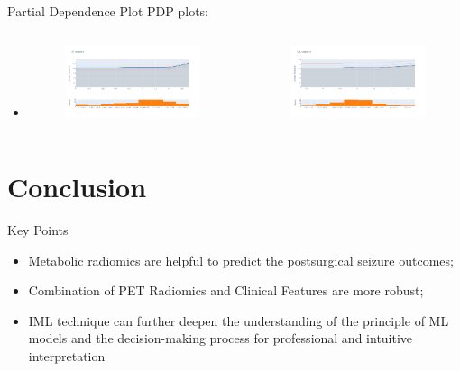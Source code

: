\documentclass[
  10pt,
  ignorenonframetext,
  fontset=fandol]{beamer}
\begin{document}
\begin{frame}{Partial Dependence Plot}
\protect\hypertarget{partial-dependence-plot}{}
PDP plots:

\begin{itemize}[<+->]
\item \begin{columns}
\begin{figure}
\centering
\includegraphics[width=6cm]{images/pdp_1.png}
\end{figure}
\begin{figure}
\centering
\includegraphics[width=6cm]{images/pdp_2.png}
\end{figure}
\end{columns}
\end{itemize}
\end{frame}

\hypertarget{conclusion}{%
\section{Conclusion}\label{conclusion}}

\begin{frame}{Key Points}
\protect\hypertarget{key-points}{}
\begin{itemize}[<+->]
\item Metabolic radiomics are helpful to predict the postsurgical seizure outcomes;
\bigskip
\item Combination of PET Radiomics and Clinical Features are more robust;
\bigskip
\item IML technique can further deepen the understanding of the principle of ML models and the decision-making process for professional and intuitive interpretation
\end{itemize}
\end{frame}
\end{document}
